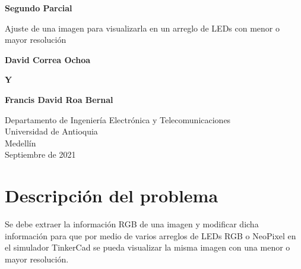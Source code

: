 \documentclass{article}
\begin{document}
	
	\begin{titlepage}
		\begin{center}
			\vspace*{1cm}
			
			\Huge
			\textbf{Segundo Parcial}
			
			\vspace{0.5cm}
			\LARGE
			Ajuste de una imagen para visualizarla en un arreglo de LEDs con menor o mayor resolución
			
			\vspace{1.5cm}
			
			\textbf{David Correa Ochoa} 
			
			\vspace{0.8cm}
			
			\textbf{Y}
			
			\vspace{0.8cm}
			
			\textbf{Francis David Roa Bernal}
			\vfill
			
			\vspace{0.8cm}
			
			\Large
			Departamento de Ingeniería Electrónica y Telecomunicaciones\\
			Universidad de Antioquia\\
			Medellín\\
			Septiembre de 2021
			
		\end{center}
	\end{titlepage}
	
	\tableofcontents
	\newpage
	\section{Descripción del problema}\label{intro}
	Se debe extraer la información RGB de una imagen y modificar dicha información para que por medio de varios arreglos de LEDs RGB o NeoPixel en el simulador TinkerCad se pueda visualizar la misma imagen con una menor o mayor resolución.
	
\end{document}
